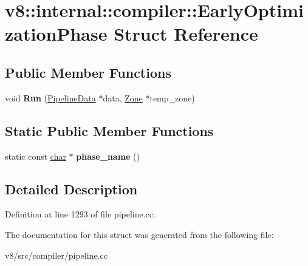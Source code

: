\hypertarget{structv8_1_1internal_1_1compiler_1_1EarlyOptimizationPhase}{}\section{v8\+:\+:internal\+:\+:compiler\+:\+:Early\+Optimization\+Phase Struct Reference}
\label{structv8_1_1internal_1_1compiler_1_1EarlyOptimizationPhase}
\subsection*{Public Member Functions}
\begin{DoxyCompactItemize}
\item 
\mbox{\label{structv8_1_1internal_1_1compiler_1_1EarlyOptimizationPhase_a630e0af9a616620e86a5c98cbeb6f0bc}} 
void {\bfseries Run} (\mbox{\hyperlink{classv8_1_1internal_1_1compiler_1_1PipelineData}{Pipeline\+Data}} $\ast$data, \mbox{\hyperlink{classv8_1_1internal_1_1Zone}{Zone}} $\ast$temp\+\_\+zone)
\end{DoxyCompactItemize}
\subsection*{Static Public Member Functions}
\begin{DoxyCompactItemize}
\item 
\mbox{\label{structv8_1_1internal_1_1compiler_1_1EarlyOptimizationPhase_aa9ed0b2d039addf569bee53b1e84f1dd}} 
static const \mbox{\hyperlink{classchar}{char}} $\ast$ {\bfseries phase\+\_\+name} ()
\end{DoxyCompactItemize}


\subsection{Detailed Description}


Definition at line 1293 of file pipeline.\+cc.



The documentation for this struct was generated from the following file\+:\begin{DoxyCompactItemize}
\item 
v8/src/compiler/pipeline.\+cc\end{DoxyCompactItemize}
